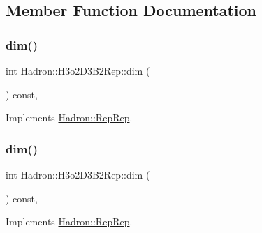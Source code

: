 \subsection{Member Function Documentation}
\mbox{\label{structHadron_1_1H3o2D3B2Rep_a95a39ec9eed1e49a38d9caadc2a67ed8}} 
\subsubsection{\texorpdfstring{dim()}{dim()}\hspace{0.1cm}{\footnotesize\ttfamily [1/5]}}
{\footnotesize\ttfamily int Hadron\+::\+H3o2\+D3\+B2\+Rep\+::dim (\begin{DoxyParamCaption}{ }\end{DoxyParamCaption}) const\hspace{0.3cm}{\ttfamily [inline]}, {\ttfamily [virtual]}}



Implements \mbox{\hyperlink{structHadron_1_1RepRep_a92c8802e5ed7afd7da43ccfd5b7cd92b}{Hadron\+::\+Rep\+Rep}}.

\mbox{\label{structHadron_1_1H3o2D3B2Rep_a95a39ec9eed1e49a38d9caadc2a67ed8}} 
\subsubsection{\texorpdfstring{dim()}{dim()}\hspace{0.1cm}{\footnotesize\ttfamily [2/5]}}
{\footnotesize\ttfamily int Hadron\+::\+H3o2\+D3\+B2\+Rep\+::dim (\begin{DoxyParamCaption}{ }\end{DoxyParamCaption}) const\hspace{0.3cm}{\ttfamily [inline]}, {\ttfamily [virtual]}}



Implements \mbox{\hyperlink{structHadron_1_1RepRep_a92c8802e5ed7afd7da43ccfd5b7cd92b}{Hadron\+::\+Rep\+Rep}}.

\mbox{\label{structHadron_1_1H3o2D3B2Rep_a95a39ec9eed1e49a38d9caadc2a67ed8}} 
